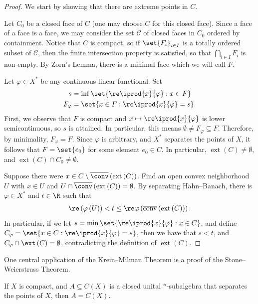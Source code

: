 \documentclass[10pt]{mypackage}
\begin{document}
\begin{proof}
  We start by showing that there are extreme points in $C$.

  Let $C_0$ be a closed face of $C$ (one may choose $C$ for this closed face). Since a face of a face is a face, we may consider the set $ \mathcal{C} $ of closed faces in $C_0$ ordered by containment. Notice that $C$ is compact, so if $\set{F_i}_{i\in I}$ is a totally ordered subset of $\mathcal{C}$, then the finite intersection property is satisfied, so that $\bigcap_{i\in I} F_i$ is non-empty. By Zorn's Lemma, there is a minimal face which we will call $F$.

  Let $\varphi\in X^{\ast}$ be any continuous linear functional. Set
  \begin{align*}
    s &= \inf\set{\re \iprod{x}{\varphi} : x\in F}\\
    F_{\varphi} &= \set{x\in F : \re \iprod{x}{\varphi} = s}.
  \end{align*}
  First, we observe that $F$ is compact and $x\mapsto \re \iprod{x}{\varphi}$ is lower semicontinuous, so $s$ is attained. In particular, this means $\emptyset\neq F_{\varphi}\subseteq F$. Therefore, by minimality, $F_{\varphi} = F$. Since $\varphi$ is arbitrary, and $X^{\ast}$ separates the points of $X$, it follows that $F = \set{e_0}$ for some element $e_0\in C$. In particular, $\operatorname{ext}\left( C \right)\neq \emptyset$, and $\operatorname{ext}\left( C \right)\cap C_0\neq \emptyset$.

  Suppose there were $x\in C\setminus \overline{\conv}\left( \operatorname{ext}\left( C \right) \right) $. Find an open convex neighborhood $U$ with $x\in U$ and $U\cap \overline{\conv}\left( \operatorname{ext}\left( C \right) \right) = \emptyset$. By separating Hahn--Banach, there is $\varphi\in X^{\ast}$ and $t\in \R$ such that
  \begin{align*}
    \re\left( \varphi\left( U \right) \right) < t \leq \re \varphi\left( \overline{\operatorname{conv}}\left( \operatorname{ext}\left( C \right) \right) \right).
  \end{align*}
  In particular, if we let $s = \min \set{\re \iprod{x}{\varphi} : x\in C}$, and define $C_{\varphi} = \set{x\in C : \re \iprod{x}{\varphi} = s}$, then we have that $s < t$, and $C_{\varphi}\cap \ext\left( C \right) = \emptyset$, contradicting the definition of $\operatorname{ext}\left( C \right)$.
\end{proof}
One central application of the Krein--Milman Theorem is a proof of the Stone--Weierstrass Theorem.
\begin{theorem}
  If $X$ is compact, and $A\subseteq C(X)$ is a closed unital $\ast$-subalgebra that separates the points of $X$, then $ A = C(X) $.
\end{theorem}
\end{document}

